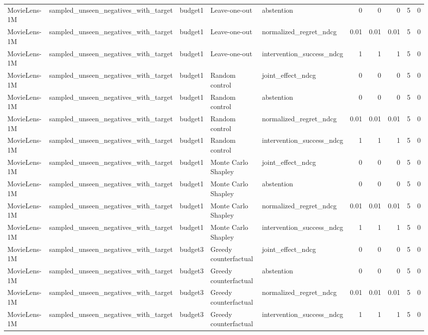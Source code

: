 \begin{table}[t]
{\begin{tabular}{lllllrrrrr}
MovieLens-1M & sampled\_unseen\_negatives\_with\_target & budget1 & Leave-one-out & abstention & 0 & 0 & 0 & 5 & 0 \\
MovieLens-1M & sampled\_unseen\_negatives\_with\_target & budget1 & Leave-one-out & normalized\_regret\_ndcg & 0.01 & 0.01 & 0.01 & 5 & 0 \\
MovieLens-1M & sampled\_unseen\_negatives\_with\_target & budget1 & Leave-one-out & intervention\_success\_ndcg & 1 & 1 & 1 & 5 & 0 \\
MovieLens-1M & sampled\_unseen\_negatives\_with\_target & budget1 & Random control & joint\_effect\_ndcg & 0 & 0 & 0 & 5 & 0 \\
MovieLens-1M & sampled\_unseen\_negatives\_with\_target & budget1 & Random control & abstention & 0 & 0 & 0 & 5 & 0 \\
MovieLens-1M & sampled\_unseen\_negatives\_with\_target & budget1 & Random control & normalized\_regret\_ndcg & 0.01 & 0.01 & 0.01 & 5 & 0 \\
MovieLens-1M & sampled\_unseen\_negatives\_with\_target & budget1 & Random control & intervention\_success\_ndcg & 1 & 1 & 1 & 5 & 0 \\
MovieLens-1M & sampled\_unseen\_negatives\_with\_target & budget1 & Monte Carlo Shapley & joint\_effect\_ndcg & 0 & 0 & 0 & 5 & 0 \\
MovieLens-1M & sampled\_unseen\_negatives\_with\_target & budget1 & Monte Carlo Shapley & abstention & 0 & 0 & 0 & 5 & 0 \\
MovieLens-1M & sampled\_unseen\_negatives\_with\_target & budget1 & Monte Carlo Shapley & normalized\_regret\_ndcg & 0.01 & 0.01 & 0.01 & 5 & 0 \\
MovieLens-1M & sampled\_unseen\_negatives\_with\_target & budget1 & Monte Carlo Shapley & intervention\_success\_ndcg & 1 & 1 & 1 & 5 & 0 \\
MovieLens-1M & sampled\_unseen\_negatives\_with\_target & budget3 & Greedy counterfactual & joint\_effect\_ndcg & 0 & 0 & 0 & 5 & 0 \\
MovieLens-1M & sampled\_unseen\_negatives\_with\_target & budget3 & Greedy counterfactual & abstention & 0 & 0 & 0 & 5 & 0 \\
MovieLens-1M & sampled\_unseen\_negatives\_with\_target & budget3 & Greedy counterfactual & normalized\_regret\_ndcg & 0.01 & 0.01 & 0.01 & 5 & 0 \\
MovieLens-1M & sampled\_unseen\_negatives\_with\_target & budget3 & Greedy counterfactual & intervention\_success\_ndcg & 1 & 1 & 1 & 5 & 0 \\

\end{tabular}}
\end{table}
